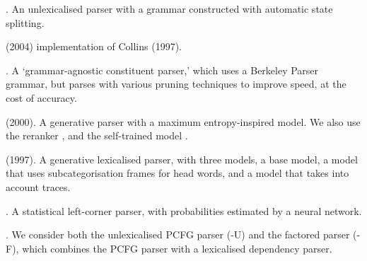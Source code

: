 \begin{description}\itemsep1pt
	\item[ Berkeley] \parencite{Petrov-etal:2006,Petrov-Klein:2007}. An
	unlexicalised parser with a grammar constructed with automatic state
	splitting.

	\item[ Bikel] (2004)\nocite{Bikel:2004} implementation of Collins (1997).

	\item[ BUBS]
	\parencite{Dunlop-Bodenstab-Roark:2011,Bodenstab-Dunlop-Hall-Roark:2011}. A
	`grammar-agnostic constituent parser,' which uses a Berkeley Parser grammar,
	but parses with various pruning techniques to improve speed, at the cost of
	accuracy.

	\item[ Charniak] (2000)\nocite{Charniak:2000}. A generative parser with a
	maximum entropy-inspired model.  We also use the reranker
	\parencite{Charniak-Johnson:2005}, and the self-trained model
	\parencite{McClosky-Charniak-Johnson:2006}.

	\item[ Collins] (1997)\nocite{Collins:1997}. A generative lexicalised parser, with
	three models, a base model, a model that uses subcategorisation
	frames for head words, and a model that takes into account traces.

	\item[ SSN] \parencite{Henderson:2003,Henderson:2004}. A statistical left-corner
	parser, with probabilities estimated by a neural network.

	\item[ Stanford] \parencite{Klein-Manning:2003,Klein-Manning:2003:NIPS}. We
	consider both the unlexicalised PCFG parser (-U) and the factored parser
	(-F), which combines the PCFG parser with a lexicalised dependency parser.
\end{description}

